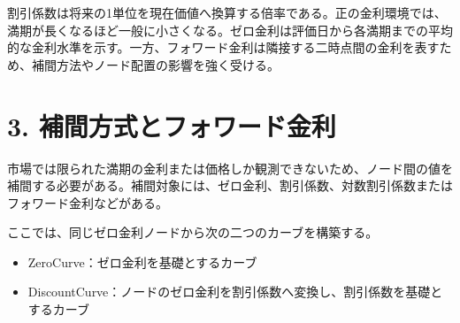 \documentclass[
  letterpaper,
  DIV=11,
  numbers=noendperiod]{scrreprt}
\providecommand{\tightlist}{%
  \setlength{\itemsep}{0pt}\setlength{\parskip}{0pt}}
\begin{document}
割引係数は将来の1単位を現在価値へ換算する倍率である。正の金利環境では、満期が長くなるほど一般に小さくなる。ゼロ金利は評価日から各満期までの平均的な金利水準を示す。一方、フォワード金利は隣接する二時点間の金利を表すため、補間方法やノード配置の影響を強く受ける。

\section{3.
補間方式とフォワード金利}\label{ux88dcux9593ux65b9ux5f0fux3068ux30d5ux30a9ux30efux30fcux30c9ux91d1ux5229}

市場では限られた満期の金利または価格しか観測できないため、ノード間の値を補間する必要がある。補間対象には、ゼロ金利、割引係数、対数割引係数またはフォワード金利などがある。

ここでは、同じゼロ金利ノードから次の二つのカーブを構築する。

\begin{itemize}
\tightlist
\item
  ZeroCurve：ゼロ金利を基礎とするカーブ
\item
  DiscountCurve：ノードのゼロ金利を割引係数へ変換し、割引係数を基礎とするカーブ
\end{itemize}
\end{document}
